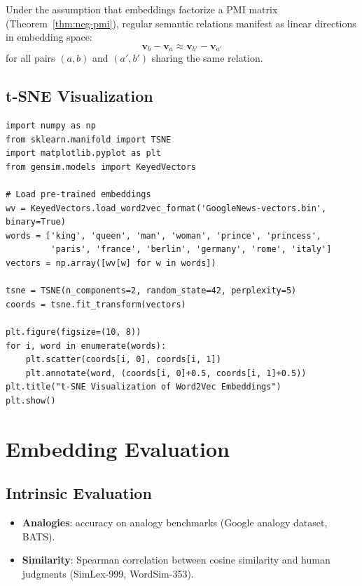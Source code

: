 \begin{theorem}
Under the assumption that embeddings factorize a PMI matrix
(Theorem~\ref{thm:neg-pmi}), regular semantic relations manifest as linear
directions in embedding space:
\[
\mathbf{v}_b - \mathbf{v}_a \approx \mathbf{v}_{b'} - \mathbf{v}_{a'}
\]
for all pairs $(a, b)$ and $(a', b')$ sharing the same relation.
\end{theorem}

\subsection{t-SNE Visualization}

\begin{codeblock}[title=\textbf{Embedding visualization}]
\begin{verbatim}
import numpy as np
from sklearn.manifold import TSNE
import matplotlib.pyplot as plt
from gensim.models import KeyedVectors

# Load pre-trained embeddings
wv = KeyedVectors.load_word2vec_format('GoogleNews-vectors.bin', binary=True)
words = ['king', 'queen', 'man', 'woman', 'prince', 'princess',
         'paris', 'france', 'berlin', 'germany', 'rome', 'italy']
vectors = np.array([wv[w] for w in words])

tsne = TSNE(n_components=2, random_state=42, perplexity=5)
coords = tsne.fit_transform(vectors)

plt.figure(figsize=(10, 8))
for i, word in enumerate(words):
    plt.scatter(coords[i, 0], coords[i, 1])
    plt.annotate(word, (coords[i, 0]+0.5, coords[i, 1]+0.5))
plt.title("t-SNE Visualization of Word2Vec Embeddings")
plt.show()
\end{verbatim}
\end{codeblock}

\section{Embedding Evaluation}
\label{sec:emb:evaluation}

\subsection{Intrinsic Evaluation}

\begin{itemize}
    \item \textbf{Analogies}: accuracy on analogy benchmarks (Google analogy
          dataset, BATS).
    \item \textbf{Similarity}: Spearman correlation between cosine similarity
          and human judgments (SimLex-999, WordSim-353).
\end{itemize}

